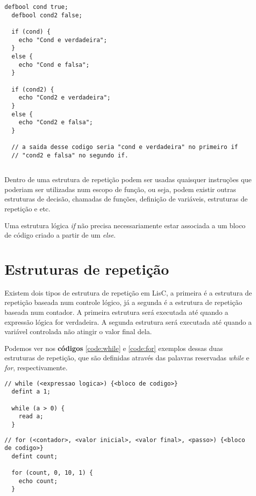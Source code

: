 \documentclass[
  12pt,				%
  oneside,			%
  a4paper,			%
  english,			%
  french,				%
  spanish,			%
  brazil,				%
]{abntex2}
\begin{document}
\begin{lstlisting}[label=code:ifelse,caption=Exemplo do uso de
  instruções de controles lógicos]
  defbool cond true;
  defbool cond2 false;

  if (cond) {
    echo "Cond e verdadeira";
  }
  else {
    echo "Cond e falsa";    
  }

  if (cond2) {
    echo "Cond2 e verdadeira";        
  }
  else {
    echo "Cond2 e falsa";        
  }

  // a saida desse codigo seria "cond e verdadeira" no primeiro if
  // "cond2 e falsa" no segundo if.
  
\end{lstlisting}

Dentro de uma estrutura de repetição podem ser usadas quaisquer
instruções que poderiam ser utilizadas num escopo de função, ou seja,
podem existir outras estruturas de decisão, chamadas de funções,
definição de variáveis, estruturas de repetição e etc.

Uma estrutura lógica \emph{if} não precisa necessariamente estar
associada a um bloco de código criado a partir de um \emph{else}.

\section{Estruturas de repetição}
\label{sec:estruturas-de-repeticao}

Existem dois tipos de estrutura de repetição em LisC, a primeira é a
estrutura de repetição baseada num controle lógico, já a segunda é a
estrutura de repetição baseada num contador. A primeira estrutura será
executada até quando a expressão lógica for verdadeira. A segunda
estrutura será executada até quando a variável controlada não atingir
o valor final dela.

Podemos ver nos \textbf{códigos} \ref{code:while} e \ref{code:for} 
exemplos dessas duas estruturas de repetição, que são definidas
através das palavras reservadas \emph{while} e \emph{for}, respectivamente.

\begin{lstlisting}[label=code:while,caption=Exemplo da estrutura de
  repetição while]
  // while (<expressao logica>) {<bloco de codigo>}
  defint a 1;

  while (a > 0) {
    read a;
  }

\end{lstlisting}

\begin{lstlisting}[label=code:for,caption=Exemplo da estrutura de
  repetição for]
  // for (<contador>, <valor inicial>, <valor final>, <passo>) {<bloco de codigo>}
  defint count;

  for (count, 0, 10, 1) {
    echo count;
  }
\end{lstlisting}
\end{document}
